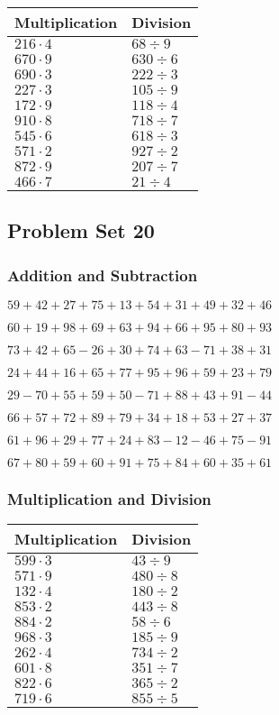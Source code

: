\begin{longtable}[]{@{}ll@{}}
\toprule
Multiplication & Division\tabularnewline
\midrule
\endhead
\(216\cdot4\) & \(68÷9\)\tabularnewline
\(670\cdot9\) & \(630÷6\)\tabularnewline
\(690\cdot3\) & \(222÷3\)\tabularnewline
\(227\cdot3\) & \(105÷9\)\tabularnewline
\(172\cdot9\) & \(118÷4\)\tabularnewline
\(910\cdot8\) & \(718÷7\)\tabularnewline
\(545\cdot6\) & \(618÷3\)\tabularnewline
\(571\cdot2\) & \(927÷2\)\tabularnewline
\(872\cdot9\) & \(207÷7\)\tabularnewline
\(466\cdot7\) & \(21÷4\)\tabularnewline
\bottomrule
\end{longtable}

\hypertarget{problem-set-20}{%
\subsection{Problem Set 20}\label{problem-set-20}}

\hypertarget{addition-and-subtraction-19}{%
\subsubsection{Addition and
Subtraction}\label{addition-and-subtraction-19}}

\(59+42+27+75+13+54+31+49+32+46\)

\(60+19+98+69+63+94+66+95+80+93\)

\(73+42+65-26+30+74+63-71+38+31\)

\(24+44+16+65+77+95+96+59+23+79\)

\(29-70+55+59+50-71+88+43+91-44\)

\(66+57+72+89+79+34+18+53+27+37\)

\(61+96+29+77+24+83-12-46+75-91\)

\(67+80+59+60+91+75+84+60+35+61\)

\hypertarget{multiplication-and-division-19}{%
\subsubsection{Multiplication and
Division}\label{multiplication-and-division-19}}

\begin{longtable}[]{@{}ll@{}}
\toprule
Multiplication & Division\tabularnewline
\midrule
\endhead
\(599\cdot3\) & \(43÷9\)\tabularnewline
\(571\cdot9\) & \(480÷8\)\tabularnewline
\(132\cdot4\) & \(180÷2\)\tabularnewline
\(853\cdot2\) & \(443÷8\)\tabularnewline
\(884\cdot2\) & \(58÷6\)\tabularnewline
\(968\cdot3\) & \(185÷9\)\tabularnewline
\(262\cdot4\) & \(734÷2\)\tabularnewline
\(601\cdot8\) & \(351÷7\)\tabularnewline
\(822\cdot6\) & \(365÷2\)\tabularnewline
\(719\cdot6\) & \(855÷5\)\tabularnewline
\bottomrule
\end{longtable}

